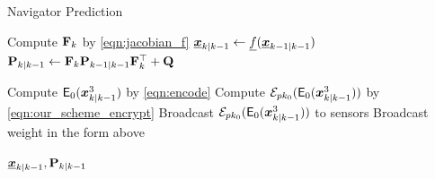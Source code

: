 \documentclass[10pt,letterpaper,oneside,twocolumn,journal]{IEEEtran}
\theoremstyle{definition}
\theoremstyle{definition}
\theoremstyle{remark}
\begin{document}
\begin{algorithm}[htbp]
\caption{Navigator Prediction}\label{alg:nav_prediction}
\begin{algorithmic}[1]

    \State Compute ${{\mathbf{F}}}_k$ by \eqref{eqn:jacobian_f}
    \State ${\boldsymbol{\underline{x}}}_{k|k-1} \gets {\underline{f}}({\boldsymbol{\underline{x}}}_{k-1|k-1})$
    \State ${{\mathbf{P}}}_{k|k-1} \gets {\ensuremath{{\mathbf{F}}}}_k{{\mathbf{P}}}_{k-1|k-1}{{\mathbf{F}}}_k^\top + {{\mathbf{Q}}}$

    \State Compute $\mathsf{E}_{0}({\boldsymbol{x}}^3_{k|k-1})$ by \eqref{eqn:encode}
    \State Compute $\mathcal{E}_{pk_0}(\mathsf{E}_{0}({\boldsymbol{x}}^3_{k|k-1}))$ by \eqref{eqn:our_scheme_encrypt}
    \State Broadcast $\mathcal{E}_{pk_0}(\mathsf{E}_{0}({\boldsymbol{x}}^3_{k|k-1}))$ to sensors
        \State Broadcast weight in the form above
    \EndFor

    \State \Return ${\boldsymbol{\underline{x}}}_{k|k-1}, {{\mathbf{P}}}_{k|k-1}$
    \EndProcedure
\end{algorithmic}
\end{algorithm}
\end{document}
